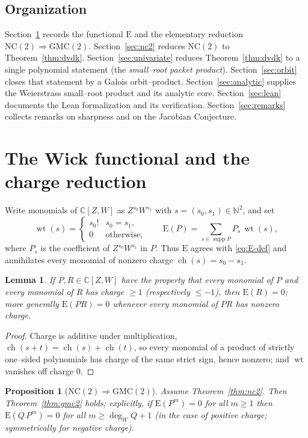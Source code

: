 \documentclass[11pt,reqno]{amsart}
\theoremstyle{plain}
\newtheorem{lemma}[theorem]{Lemma}
\newtheorem{proposition}[theorem]{Proposition}
\theoremstyle{definition}
\newcommand{\C}{\mathbb{C}}
\newcommand{\N}{\mathbb{N}}
\newcommand{\E}{\mathrm{E}}
\newcommand{\ch}{\operatorname{ch}}
\newcommand{\wt}{\operatorname{wt}}
\newcommand{\supp}{\operatorname{supp}}
\begin{document}
\subsection{Organization}
Section~\ref{sec:charge} records the functional $\E$ and the elementary reduction
$\text{NC}(2)\Rightarrow\text{GMC}(2)$. Section~\ref{sec:nc2} reduces $\text{NC}(2)$ to
Theorem~\ref{thm:dvdk}. Section~\ref{sec:univariate} reduces Theorem~\ref{thm:dvdk} to a single
polynomial statement (the \emph{small--root packet product}). Section~\ref{sec:orbit} closes that
statement by a Galois orbit--product. Section~\ref{sec:analytic} supplies the Weierstrass small--root
product and its analytic core. Section~\ref{sec:lean} documents the Lean formalization and its
verification. Section~\ref{sec:remarks} collects remarks on sharpness and on the Jacobian Conjecture.

\section{The Wick functional and the charge reduction}\label{sec:charge}

Write monomials of $\C[Z,W]$ as $Z^{s_0}W^{s_1}$ with $s=(s_0,s_1)\in\N^2$, and set
\[
  \wt(s)=\begin{cases} s_0! & s_0=s_1,\\ 0 & \text{otherwise,}\end{cases}
  \qquad
  \E(P)=\sum_{s\in\supp P} P_s\,\wt(s),
\]
where $P_s$ is the coefficient of $Z^{s_0}W^{s_1}$ in $P$. Thus $\E$ agrees with \eqref{eq:E-def} and
annihilates every monomial of nonzero charge $\ch(s)=s_0-s_1$.

\begin{lemma}\label{lem:charge-kill}
If $P,R\in\C[Z,W]$ have the property that every monomial of $P$ and every monomial of $R$ has charge
$\ge 1$ (respectively $\le -1$), then $\E(R)=0$; more generally $\E(PR)=0$ whenever every monomial of
$PR$ has nonzero charge.
\end{lemma}

\begin{proof}
Charge is additive under multiplication, $\ch(s+t)=\ch(s)+\ch(t)$, so every monomial of a product of
strictly one--sided polynomials has charge of the same strict sign, hence nonzero; and $\wt$ vanishes off
charge $0$.
\end{proof}

\begin{proposition}[$\text{NC}(2)\Rightarrow\text{GMC}(2)$]\label{prop:nc2-to-gmc2}
Assume Theorem~\ref{thm:nc2}. Then Theorem~\ref{thm:gmc2} holds; explicitly, if $\E(P^m)=0$ for all
$m\ge1$ then $\E(Q\,P^m)=0$ for all $m\ge \deg_W Q+1$ (in the case of positive charge; symmetrically for
negative charge).
\end{proposition}
\end{document}
